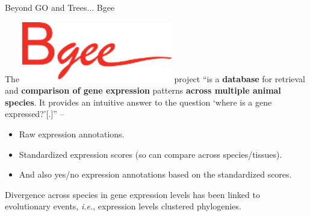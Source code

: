 \documentclass[10pt,aspectratio=169]{beamer}
\newcounter{frame}[frame]
\begin{document}
\begin{frame}{Beyond GO and Trees... Bgee}


The \includegraphics[width=.1\linewidth]{fig/bgee_logo.png} project ``is a \textbf{database} for retrieval and \textbf{comparison of gene expression} patterns \textbf{across multiple animal species}. It provides an intuitive answer to the question `where is a gene expressed?'[.]'' -- \textcite{bastianBgeeSuiteIntegrated2021}

\vfill

\begin{itemize}
    \item Raw expression annotations.
    \item Standardized expression scores (so can compare across species/tissues).
    \item And also yes/no expression annotations based on the standardized scores.
\end{itemize}

\vfill

\pause Divergence across species in gene expression levels has been linked to evolutionary events\autocite{nabholzHighLevelsGene2013, hodgins-davisEvolvingGeneExpression2009}, \textit{i.e.}, expression levels clustered phylogenies.\\\bigskip
\end{frame}

\end{document}
